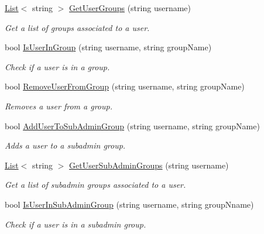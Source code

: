 \begin{DoxyCompactItemize}
\hyperlink{classowncloudsharp_1_1_client_a914c144ebbe207958829523f7eda3609}{List}$<$ string $>$ \hyperlink{classowncloudsharp_1_1_client_a18acf90fef2b57c03effffb6f052e873}{Get\+User\+Groups} (string username)
\begin{DoxyCompactList}\small\item\em Get a list of groups associated to a user. \end{DoxyCompactList}\item 
bool \hyperlink{classowncloudsharp_1_1_client_a3ad615fa0f35fe632d80a8149c8cad74}{Is\+User\+In\+Group} (string username, string group\+Name)
\begin{DoxyCompactList}\small\item\em Check if a user is in a group. \end{DoxyCompactList}\item 
bool \hyperlink{classowncloudsharp_1_1_client_a8c2bcb8ca08d661bb4c15b8cc07eaf5d}{Remove\+User\+From\+Group} (string username, string group\+Name)
\begin{DoxyCompactList}\small\item\em Removes a user from a group. \end{DoxyCompactList}\item 
bool \hyperlink{classowncloudsharp_1_1_client_a99a393c20b57e50c10ee337b09ed75b3}{Add\+User\+To\+Sub\+Admin\+Group} (string username, string group\+Name)
\begin{DoxyCompactList}\small\item\em Adds a user to a subadmin group. \end{DoxyCompactList}\item 
\hyperlink{classowncloudsharp_1_1_client_a914c144ebbe207958829523f7eda3609}{List}$<$ string $>$ \hyperlink{classowncloudsharp_1_1_client_adc4b7d35c74b8ef9d32110c36bf57b37}{Get\+User\+Sub\+Admin\+Groups} (string username)
\begin{DoxyCompactList}\small\item\em Get a list of subadmin groups associated to a user. \end{DoxyCompactList}\item 
bool \hyperlink{classowncloudsharp_1_1_client_a62e091c3df9d3dcd40794b89de04e481}{Is\+User\+In\+Sub\+Admin\+Group} (string username, string group\+Nname)
\begin{DoxyCompactList}\small\item\em Check if a user is in a subadmin group. \end{DoxyCompactList}\item 

\end{DoxyCompactItemize}
